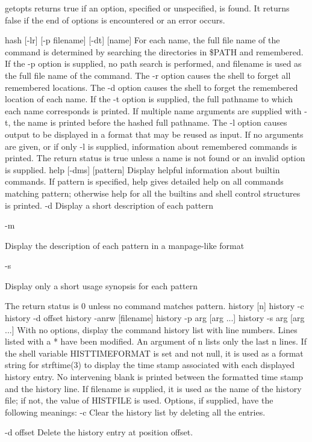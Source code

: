 getopts returns true if an option, specified or unspecified, is found. It returns false if the end of options is encountered or an error occurs.

hash [-lr] [-p filename] [-dt] [name]
For each name, the full file name of the command is determined by searching the directories in \$PATH and remembered. If the -p option is supplied, no path search is performed, and filename is used as the full file name of the command. The -r option causes the shell to forget all remembered locations. The -d option causes the shell to forget the remembered location of each name. If the -t option is supplied, the full pathname to which each name corresponds is printed. If multiple name arguments are supplied with -t, the name is printed before the hashed full pathname. The -l option causes output to be displayed in a format that may be reused as input. If no arguments are given, or if only -l is supplied, information about remembered commands is printed. The return status is true unless a name is not found or an invalid option is supplied.
help [-dms] [pattern]
Display helpful information about builtin commands. If pattern is specified, help gives detailed help on all commands matching pattern; otherwise help for all the builtins and shell control structures is printed.
-d
Display a short description of each pattern

-m

Display the description of each pattern in a manpage-like format

-s

Display only a short usage synopsis for each pattern

The return status is 0 unless no command matches pattern.
history [n]
history -c
history -d offset
history -anrw [filename]
history -p arg [arg ...]
history -s arg [arg ...]
With no options, display the command history list with line numbers. Lines listed with a * have been modified. An argument of n lists only the last n lines. If the shell variable HISTTIMEFORMAT is set and not null, it is used as a format string for strftime(3) to display the time stamp associated with each displayed history entry. No intervening blank is printed between the formatted time stamp and the history line. If filename is supplied, it is used as the name of the history file; if not, the value of HISTFILE is used. Options, if supplied, have the following meanings:
-c
Clear the history list by deleting all the entries.

-d offset
Delete the history entry at position offset.


